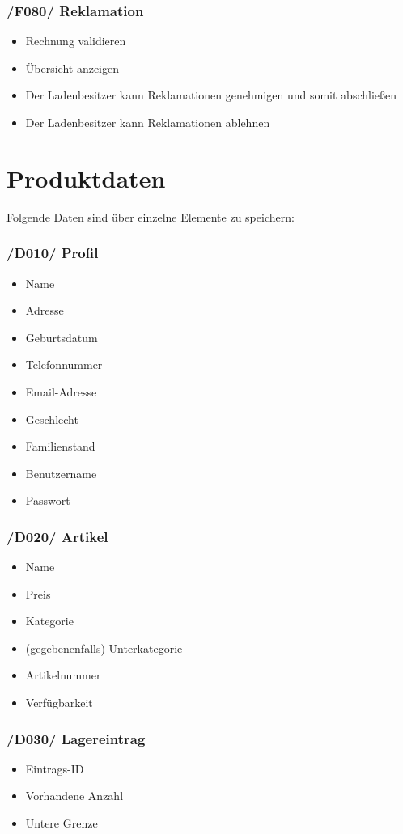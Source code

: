\documentclass[pdftex,12pt,a4paper]{article}
\begin{document}
\subsubsection*{/F080/ Reklamation}
\begin{itemize}
\item Rechnung validieren
\item \"Ubersicht anzeigen
\item Der Ladenbesitzer kann Reklamationen genehmigen und somit abschlie\ss{}en
\item Der Ladenbesitzer kann Reklamationen ablehnen
\end{itemize}

\section{Produktdaten}
Folgende Daten sind \"uber einzelne Elemente zu speichern:
\subsubsection*{/D010/ Profil}
\begin{itemize}
\item Name
\item Adresse
\item Geburtsdatum
\item Telefonnummer
\item Email-Adresse
\item Geschlecht
\item Familienstand
\item Benutzername
\item Passwort
\end{itemize}
\subsubsection*{/D020/ Artikel}
\begin{itemize}
\item Name
\item Preis
\item Kategorie
\item (gegebenenfalls) Unterkategorie
\item Artikelnummer
\item Verf\"ugbarkeit
\end{itemize}
\subsubsection*{/D030/ Lagereintrag}
\begin{itemize}
\item Eintrags-ID
\item Vorhandene Anzahl
\item Untere Grenze
\end{itemize}
\end{document}
